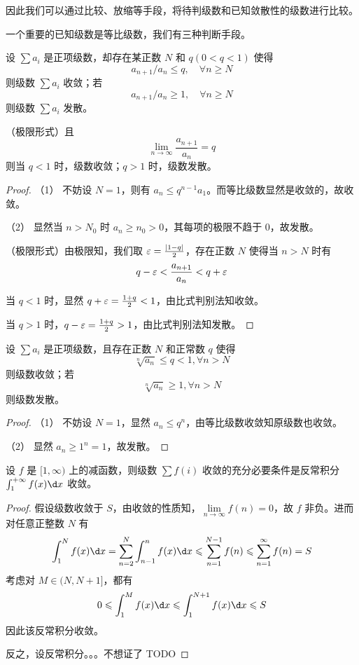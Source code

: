 因此我们可以通过比较、放缩等手段，将待判级数和已知敛散性的级数进行比较。

一个重要的已知级数是等比级数，我们有三种判断手段。

\begin{theorem}[比式判别法]
	设 $\sum a_i$ 是正项级数，却存在某正数 $N$ 和 $q(0 < q < 1)$ 使得
	\[ a_{n+1} / a_n \leqslant q, \quad \forall n \geqslant N \]
	则级数 $\sum a_i$ 收敛；若
	\[ a_{n+1} / a_n \geqslant 1, \quad \forall n \geqslant N \]
	则级数 $\sum a_i$ 发散。
	
	
	（极限形式）且
	\[ \lim_{n \to \infty} \frac{a_{n+1}}{a_n} = q \]
	则当 $q < 1$ 时，级数收敛；$q > 1$ 时，级数发散。
\end{theorem}

\begin{proof}
	（1） 不妨设 $N = 1$，则有 $a_n \leqslant q^{n-1}a_1$。而等比级数显然是收敛的，故收敛。
	
	（2） 显然当 $n > N_0$ 时 $a_n \geqslant n_0 > 0$，其每项的极限不趋于 $0$，故发散。
	
	（极限形式）由极限知，我们取 $\varepsilon = \frac{|1-q|}{2}$，存在正数 $N$ 使得当 $n > N$ 时有
	\[ q - \varepsilon < \frac{a_{n+1}}{a_n} < q + \varepsilon \]
	
	当 $q<1$ 时，显然 $q + \varepsilon = \frac{1+q}{2} < 1$，由比式判别法知收敛。
	
	当 $q > 1$ 时，$q - \varepsilon = \frac{1+q}{2} > 1$，由比式判别法知发散。
\end{proof}

\begin{theorem}
	设 $\sum a_i$ 是正项级数，且存在正数 $N$ 和正常数 $q$ 使得
	\[ \sqrt[n]{a_n} \leqslant q < 1, \forall n > N \]
	则级数收敛；若
	\[ \sqrt[n]{a_n} \geqslant 1, \forall n > N \]
	则级数发散。
\end{theorem}

\begin{proof}
	（1） 不妨设 $N=1$，显然 $a_n \leqslant q^n$，由等比级数收敛知原级数也收敛。
	
	（2） 显然 $a_n \geqslant 1^n = 1$，故发散。
\end{proof}

\begin{theorem}[积分判别法]
	设 $f$ 是 $[1, \infty)$ 上的减函数，则级数 $\sum f(i)$ 收敛的充分必要条件是反常积分 $\int_{1}^{+\infty} f(x) \d x$ 收敛。
\end{theorem}

\begin{proof}
	假设级数收敛于 $S$，由收敛的性质知，$\lim\limits_{n \to \infty} f(n) = 0$，故 $f$ 非负。进而对任意正整数 $N$ 有
	\[ \int_{1}^{N} f(x) \d x = \sum_{n=2}^N \int_{n -1}^{n} f(x) \d x \leqslant \sum_{n=1}^{N-1} f(n) \leqslant \sum_{n=1}^{\infty} f(n) = S \]
	考虑对 $M \in (N, N + 1]$，都有
	\[ 0 \leqslant \int_{1}^{M} f(x) \d x \leqslant \int_{1}^{N+1} f(x) \d x \leqslant S \]
	因此该反常积分收敛。
	
	反之，设反常积分。。。不想证了 TODO
\end{proof}

